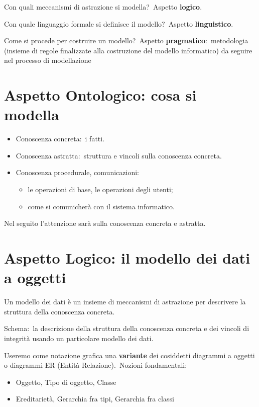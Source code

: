 \noindent Con quali meccanismi di astrazione si modella?\
Aspetto \textbf{logico}.\

\noindent Con quale linguaggio formale si definisce il modello?\
Aspetto \textbf{linguistico}.\

\noindent Come si procede per costruire un modello?\
Aspetto \textbf{pragmatico}:\ metodologia (insieme di regole finalizzate alla costruzione del modello informatico) da seguire nel processo di modellazione

\section{Aspetto Ontologico: cosa si modella}
\begin{itemize}
	\item Conoscenza concreta:\ i fatti.
	\item Conoscenza astratta:\ struttura e vincoli sulla conoscenza concreta.
	\item Conoscenza procedurale, comunicazioni:
	      \begin{itemize}
		      \item le operazioni di base, le operazioni degli utenti;
		      \item come si comunicherà con il sistema informatico.
	      \end{itemize}
\end{itemize}
Nel seguito l'attenzione sarà sulla conoscenza concreta e astratta.

\section{Aspetto Logico: il modello dei dati a oggetti}

Un modello dei dati è un insieme di meccanismi di astrazione per descrivere la struttura della conoscenza concreta.\

Schema:\ la descrizione della struttura della conoscenza concreta e dei vincoli di integrità usando un particolare modello dei dati.

Useremo come notazione grafica una \textbf{variante} dei cosiddetti diagrammi a oggetti o diagrammi ER (Entità-Relazione).\
Nozioni fondamentali:
\begin{itemize}
	\item Oggetto, Tipo di oggetto, Classe
	\item Ereditarietà, Gerarchia fra tipi, Gerarchia fra classi
\end{itemize}

